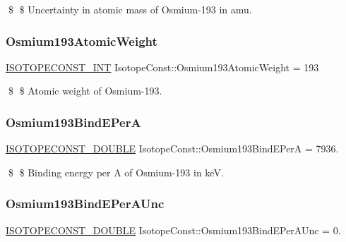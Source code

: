 \$ \$ Uncertainty in atomic mass of Osmium-\/193 in amu. \mbox{\label{group___isotope_const-_osmium-_os193_ga7cbf166a0585b85ea83894f05a0ce41c}} 
\subsubsection{\texorpdfstring{Osmium193\+Atomic\+Weight}{Osmium193AtomicWeight}}
{\footnotesize\ttfamily \mbox{\hyperlink{group___isotope_const-_macros_ga5f18360b3e99483a35c32d789e62621c}{I\+S\+O\+T\+O\+P\+E\+C\+O\+N\+S\+T\+\_\+\+I\+NT}} Isotope\+Const\+::\+Osmium193\+Atomic\+Weight = 193}

\$ \$ Atomic weight of Osmium-\/193. \mbox{\label{group___isotope_const-_osmium-_os193_ga8c9bbc82dc496db3c3b3fdea14d7028e}} 
\subsubsection{\texorpdfstring{Osmium193\+Bind\+E\+PerA}{Osmium193BindEPerA}}
{\footnotesize\ttfamily \mbox{\hyperlink{group___isotope_const-_macros_ga8f45a7272ce02c0b4c65c44636ed719a}{I\+S\+O\+T\+O\+P\+E\+C\+O\+N\+S\+T\+\_\+\+D\+O\+U\+B\+LE}} Isotope\+Const\+::\+Osmium193\+Bind\+E\+PerA = 7936.}

\$ \$ Binding energy per A of Osmium-\/193 in keV. \mbox{\label{group___isotope_const-_osmium-_os193_ga96ea7d2ba45118a43faf2861fb516f1b}} 
\subsubsection{\texorpdfstring{Osmium193\+Bind\+E\+Per\+A\+Unc}{Osmium193BindEPerAUnc}}
{\footnotesize\ttfamily \mbox{\hyperlink{group___isotope_const-_macros_ga8f45a7272ce02c0b4c65c44636ed719a}{I\+S\+O\+T\+O\+P\+E\+C\+O\+N\+S\+T\+\_\+\+D\+O\+U\+B\+LE}} Isotope\+Const\+::\+Osmium193\+Bind\+E\+Per\+A\+Unc = 0.}

